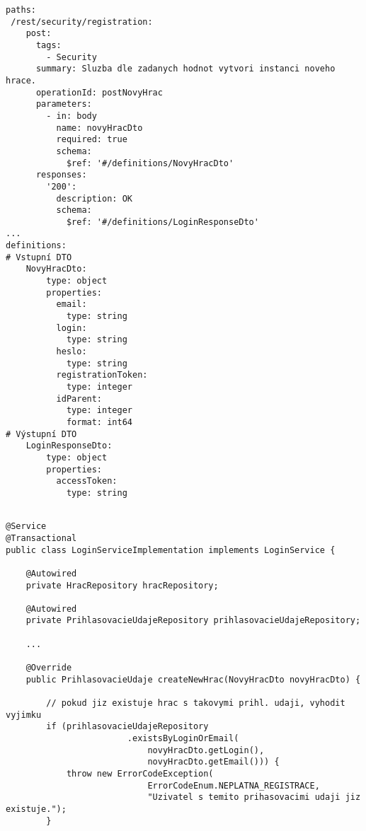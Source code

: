 \documentclass[twoside, 12pt]{article}
\begin{document}
{{\begin{literatura}
\end{literatura}

\prilohy

\clearpage




\begin{lstlisting}
paths:
 /rest/security/registration:
    post:
      tags:
        - Security
      summary: Sluzba dle zadanych hodnot vytvori instanci noveho hrace.
      operationId: postNovyHrac
      parameters:
        - in: body
          name: novyHracDto
          required: true
          schema:
            $ref: '#/definitions/NovyHracDto'
      responses:
        '200':
          description: OK
          schema:
            $ref: '#/definitions/LoginResponseDto'
...
definitions:
# Vstupní DTO
    NovyHracDto:
        type: object
        properties:
          email:
            type: string
          login:
            type: string
          heslo:
            type: string
          registrationToken:
            type: integer
          idParent:
            type: integer
            format: int64
# Výstupní DTO
    LoginResponseDto:
        type: object
        properties:
          accessToken:
            type: string
\end{lstlisting}


\begin{lstlisting}

@Service
@Transactional
public class LoginServiceImplementation implements LoginService {

    @Autowired
    private HracRepository hracRepository;

    @Autowired
    private PrihlasovacieUdajeRepository prihlasovacieUdajeRepository;

    ...

    @Override
    public PrihlasovacieUdaje createNewHrac(NovyHracDto novyHracDto) {

        // pokud jiz existuje hrac s takovymi prihl. udaji, vyhodit vyjimku
        if (prihlasovacieUdajeRepository
                        .existsByLoginOrEmail(
                            novyHracDto.getLogin(),
                            novyHracDto.getEmail())) {
            throw new ErrorCodeException(
                            ErrorCodeEnum.NEPLATNA_REGISTRACE,
                            "Uzivatel s temito prihasovacimi udaji jiz existuje.");
        }


\end{lstlisting}}}
\end{document}
